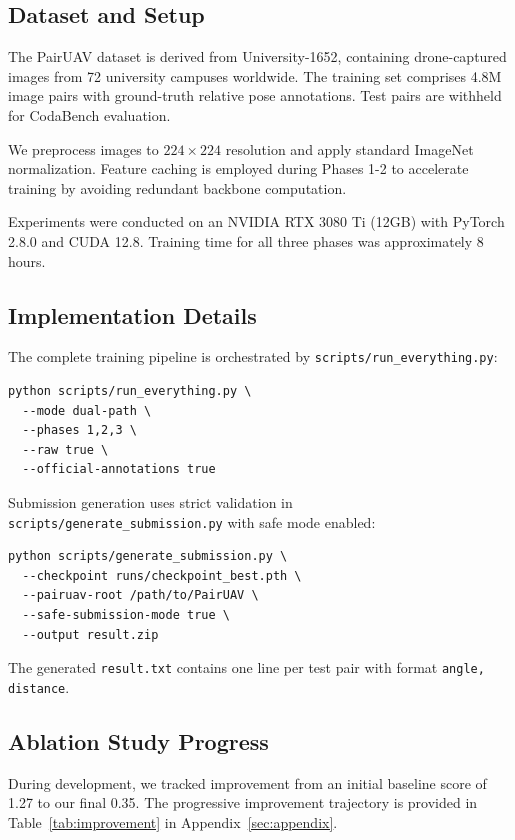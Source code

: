 \documentclass[sigconf,nonacm]{acmart}
\begin{document}
\subsection{Dataset and Setup}

The PairUAV dataset is derived from University-1652, containing drone-captured images from 72 university campuses worldwide. The training set comprises 4.8M image pairs with ground-truth relative pose annotations. Test pairs are withheld for CodaBench evaluation.

We preprocess images to $224 \times 224$ resolution and apply standard ImageNet normalization. Feature caching is employed during Phases 1-2 to accelerate training by avoiding redundant backbone computation.

Experiments were conducted on an NVIDIA RTX 3080 Ti (12GB) with PyTorch 2.8.0 and CUDA 12.8. Training time for all three phases was approximately 8 hours.

\subsection{Implementation Details}

The complete training pipeline is orchestrated by \texttt{scripts/run\_everything.py}:

\begin{lstlisting}[caption={End-to-end training command.}]
python scripts/run_everything.py \
  --mode dual-path \
  --phases 1,2,3 \
  --raw true \
  --official-annotations true
\end{lstlisting}

Submission generation uses strict validation in \texttt{scripts/generate\_submission.py} with safe mode enabled:

\begin{lstlisting}[caption={Submission generation with validation.}]
python scripts/generate_submission.py \
  --checkpoint runs/checkpoint_best.pth \
  --pairuav-root /path/to/PairUAV \
  --safe-submission-mode true \
  --output result.zip
\end{lstlisting}

The generated \texttt{result.txt} contains one line per test pair with format \texttt{angle, distance}.

\subsection{Ablation Study Progress}

During development, we tracked improvement from an initial baseline score of 1.27 to our final 0.35. The progressive improvement trajectory is provided in Table~\ref{tab:improvement} in Appendix~\ref{sec:appendix}.
\end{document}
